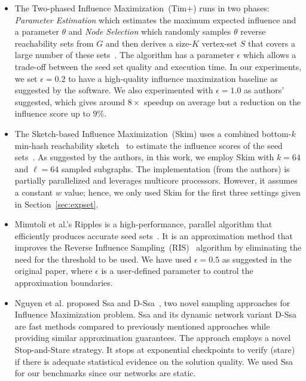 \documentclass[final,5p,times,twocolumn]{elsarticle}
\begin{document}
\begin{itemize} [leftmargin=0.3cm]
\item The Two-phased Influence Maximization~({\sc Tim+}) runs in two phases: {\em Parameter Estimation} which estimates the maximum expected influence and a parameter $\theta$ and {\em Node Selection} which randomly samples $\theta$ reverse reachability sets from $G$ and then derives a size-$K$ vertex-set $S$ that covers a large number of these sets~\cite{tim}. The algorithm has a parameter $\epsilon$ which allows a trade-off between the seed set quality and execution time. In our experiments, we set  $\epsilon=0.2$ to have a high-quality influence maximization baseline as suggested by the software. We also experimented with $\epsilon = 1.0$ as authors' suggested, which gives around $8\times$ speedup on average but a reduction on the influence score up to $9\%$.

\item The Sketch-based Influence Maximization~({\sc Skim}) uses a combined bottom-$k$ min-hash reachability sketch~\cite{bottomk} to estimate the influence scores of the seed sets~\cite{cohen2014sketch}. As suggested by the authors, in this work, we employ {\sc Skim} with $k = 64$ and $\ell = 64$ sampled subgraphs. The implementation (from the authors) is partially parallelized and leverages multicore processors. However, it  assumes a constant $w$ value; hence, we only used {\sc Skim} for the first three settings given in Section~\ref{sec:expset}.

\item Minutoli et al.'s {\sc Ripples} is a high-performance, parallel algorithm that efficiently produces accurate seed sets~\cite{minutoli2019fast}. 
It is an approximation method that improves the Reverse Influence Sampling~(RIS)~\cite{borgs2014maximizing} algorithm by eliminating the need for the threshold to be used. %
We have used $\epsilon = 0.5$ as suggested in the original paper, where $\epsilon$ is a user-defined parameter to control the approximation boundaries.

\item Nguyen et al. proposed {\sc Ssa} and {\sc D-Ssa}~\cite{nguyen2016stop}, two novel sampling approaches for Influence Maximization problem. {\sc Ssa} and its dynamic network variant {\sc D-Ssa} are fast methods compared to previously mentioned approaches while providing similar approximation guarantees. The approach employs a novel Stop-and-Stare strategy. It stops at exponential checkpoints to verify (stare) if there is adequate statistical evidence on the solution quality. We used {\sc Ssa} for our benchmarks since our networks are static. 


\end{itemize}
\end{document}

